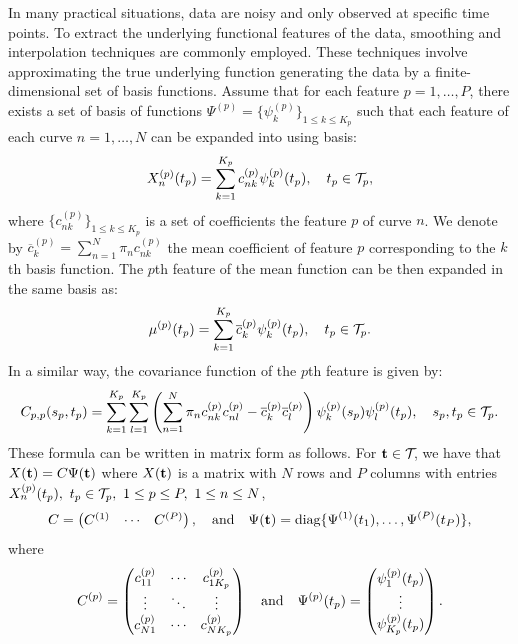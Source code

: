 
In many practical situations, data are noisy and only observed at specific time points. To extract the underlying functional features of the data, smoothing and interpolation techniques are commonly employed. These techniques involve approximating the true underlying function generating the data by a finite-dimensional set of basis functions. Assume that for each feature $p = 1, \dots, P$, there exists a set of basis of functions $\Psi^{(p)} = \{\psi_k^{(p)}\}_{1 \leq k \leq K_p}$ such that each feature of each curve $n = 1, \dots, N$ can be expanded into using basis:
\begin{equation}\label{eq:curve_basis_expansion}
X_n^{(p)}(t_p) = \sum_{k = 1}^{K_p} c^{(p)}_{nk}\psi_k^{(p)}(t_p), \quad t_p \in \mathcal{T}_{p},
\end{equation}
where $\{c^{(p)}_{nk}\}_{1 \leq k \leq K_p}$ is a set of coefficients the feature $p$ of curve $n$. We denote by $\overline{c}_k^{(p)} = \sum_{n = 1}^N \pi_n c^{(p)}_{nk}$ the mean coefficient of feature $p$ corresponding to the $k$th basis function.
The $p$th feature of the mean function can be then expanded in the same basis as:
\begin{equation}
    \mu^{(p)}(t_p) = \sum_{k = 1}^{K_p} \overline{c}_k^{(p)}\psi_k^{(p)}(t_p), \quad t_p \in \mathcal{T}_{p}.
\end{equation}
In a similar way, the covariance function of the $p$th feature is given by:
\begin{equation}
    C_{p,p}(s_p, t_p) = \sum_{k = 1}^{K_p} \sum_{l = 1}^{K_p} \left(\sum_{n = 1}^N \pi_n c^{(p)}_{nk}c^{(p)}_{nl} - \overline{c}_k^{(p)}\overline{c}_l^{(p)}\right)\psi_k^{(p)}(s_p)\psi_l^{(p)}(t_p), \quad s_p, t_p \in \mathcal{T}_{p}.
\end{equation}
These formula can be written in matrix form as follows. For $\mathbf{t} \in \mathcal{T}_{}$, we have that $X(\mathbf{t}) = C\Psi(\mathbf{t})$ where $X(\mathbf{t})$ is a matrix with $N$ rows and $P$ columns with entries $X_n^{(p)}(t_p),~t_p \in \mathcal{T}_{p},~1 \leq p \leq P,~1 \leq n \leq N$,
\begin{equation}
    C = \begin{pmatrix}
            C^{(1)} & \cdots & C^{(P)} \\
        \end{pmatrix}, \quad \text{and}\quad
    \Psi(\mathbf{t}) = \text{diag}\{\Psi^{(1)}(t_1), \dots, \Psi^{(P)}(t_P)\},
\end{equation}
where
\begin{equation}
C^{(p)} = \begin{pmatrix}
    c^{(p)}_{11} & \cdots & c^{(p)}_{1K_p} \\
    \vdots & \ddots & \vdots \\
    c^{(p)}_{N1} & \cdots & c^{(p)}_{NK_p}
\end{pmatrix} \\
\quad \text{and}\quad
\Psi^{(p)}(t_p) = \begin{pmatrix}
    \psi_1^{(p)}(t_p) \\
    \vdots \\
    \psi_{K_p}^{(p)}(t_p)
\end{pmatrix}.
\end{equation}
